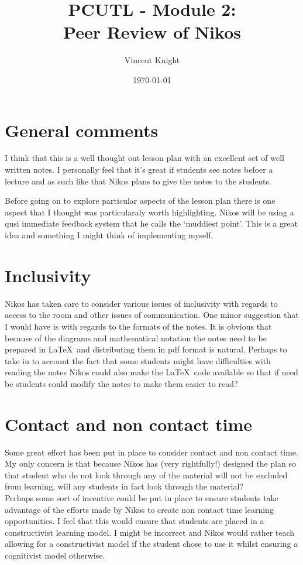 \documentclass[a4paper,12pt]{article}
\title{PCUTL - Module 2:\\ Peer Review of Nikos}
\author{Vincent Knight}
\date{\today}
\begin{document}
\maketitle

\section{General comments}

I think that this is a well thought out lesson plan with an excellent set of well written notes. I personally feel that it's great if students see notes befoer a lecture and as such like that Nikos plans to give the notes to the students.

Before going on to explore particular aspects of the lesson plan there is one aspect that I thought was particularaly worth highlighting. Nikos will be using a qusi immediate feedback system that he calls the `muddiest point'. This is a great idea and something I might think of implementing myself.

\section{Inclusivity}

Nikos has taken care to consider various issues of inclusivity with regards to access to the room and other issues of communication. One minor suggestion that I would have is with regards to the formats of the notes. It is obvious that because of the diagrams and mathematical notation the notes need to be prepared in \LaTeX\ and distributing them in pdf format is natural. Perhaps to take in to account the fact that some students might have difficulties with reading the notes Nikos could also make the \LaTeX\ code available so that if need be students could modify the notes to make them easier to read?

\section{Contact and non contact time}

Some great effort has been put in place to consider contact and non contact time. My only concern is that because Nikos has (very rightfully!) designed the plan so that student who do not look through any of the material will not be excluded from learning, will any students in fact look through the material?\\

Perhaps some sort of incentive could be put in place to ensure students take advantage of the efforts made by Nikos to create non contact time learning opportunities. I feel that this would ensure that students are placed in a constructivist learning model. I might be incorrect and Nikos would rather teach allowing for a constructivist model if the student chose to use it whilst ensuring a cognitivist model otherwise.\\
\end{document}
